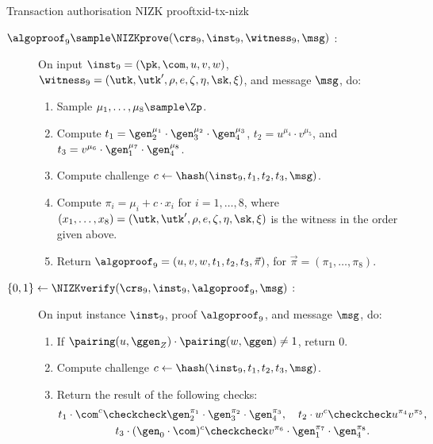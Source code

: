 \begin{protocolbox}{Transaction authorisation NIZK proof}{txid-tx-nizk}

  \begin{description}

    \item[$\algoproof_9 \sample \NIZKprove(\crs_9, \inst_9, \witness_9, \msg)$
      :] On input $\inst_9 = (\pk, \com, u, v, w)$, $\witness_9 = (\utk, \utk',
      \rho, e, \zeta, \eta, \sk, \xi)$, and message $\msg$, do:

      \begin{enumerate}

        \item Sample $\mu_1, \ldots, \mu_8 \sample \Zp$.

        \item Compute $t_1 = \gen_2^{\mu_1}\cdot\gen_3^{\mu_2}\cdot
          \gen_4^{\mu_3}$, $t_2 = u^{\mu_4}\cdot v^{\mu_5}$, and $t_3 =
          v^{\mu_6}\cdot\gen_1^{\mu_7}\cdot \gen_4^{\mu_8}$.

        \item Compute challenge $c \leftarrow \hash(\inst_9, t_1, t_2, t_3,
          \msg)$.

        \item Compute $\pi_i = \mu_i + c\cdot x_i$ for $i = 1,\ldots,8$, where
          $(x_1,\ldots,x_8) = (\utk, \utk', \rho, e, \zeta, \eta, \sk, \xi)$ is
          the witness in the order given above.

        \item Return $\algoproof_9 = (u, v, w, t_1, t_2, t_3, \vec{\pi})$, for
          $\vec{\pi} = (\pi_1,\ldots,\pi_8)$.

      \end{enumerate}

    \item[$\{0,1\} \leftarrow \NIZKverify(\crs_9, \inst_9, \algoproof_9, \msg)$
      :] On input instance $\inst_9$, proof $\algoproof_9$, and message $\msg$,
      do:

      \begin{enumerate}

        \item If $\pairing(u, \ggen_Z)\cdot \pairing(w, \ggen) \neq 1$, return
          $0$.

        \item Compute challenge $c \leftarrow \hash(\inst_9, t_1, t_2, t_3,
          \msg)$.

        \item Return the result of the following checks:
          \begin{gather*} t_1\cdot\com^c \checkcheck
            \gen_2^{\pi_1}\cdot\gen_3^{\pi_2}\cdot\gen_4^{\pi_3}, \quad
            t_2\cdot w^c \checkcheck u^{\pi_4}v^{\pi_5}, \\
            t_3\cdot(\gen_0\cdot\com)^c \checkcheck v^{\pi_6}\cdot
            \gen_1^{\pi_7}\cdot\gen_4^{\pi_8}.  \end{gather*}


\end{enumerate}
\end{description}
\end{protocolbox}
